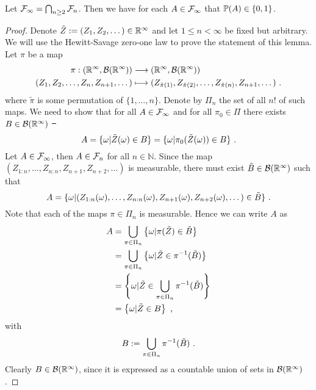 \begin{lemma} \label{lem:hewitt_savage}
	Let $\F_\infty = \bigcap_{n\geq 2} \F_n$. Then we have for each $A\in \F_\infty$ that $\P(A)\in \{0,1\}$.
	\begin{proof}
		Denote $\tilde{Z}:=(Z_1, Z_2,\dots)\in\R^\infty$ and let $1\leq n<\infty$ be fixed but arbitrary. We will use the Hewitt-Savage zero-one law to prove the statement of this lemma. Let $\pi$  be a map
		\begin{align*}
		\pi: (\R^\infty, \mathcal{B}(\R^\infty)) &\longrightarrow (\R^\infty, \mathcal{B}(\R^\infty))\\
		(Z_1, Z_2,\dots,Z_n, Z_{n+1}, \dots) &\longmapsto (Z_{\tilde\pi(1)}, Z_{\tilde\pi(2)},\dots,Z_{\tilde\pi(n)}, Z_{n+1}, \dots)\mdot
		\end{align*}
		where $\tilde{\pi}$ is some permutation of $\{1,\dots,n\}$. Denote by $\Pi_n$ the set of all $n!$ of such maps. 
		We need to show that for all $A\in\F_\infty$ and for all $\pi_0\in\Pi$ there exists $B\in\mathcal{B}(\R^\infty)$ \st\ 
		\begin{equation}
		A = \{\omega| \tilde{Z}(\omega) \in B\} = \{\omega| \pi_0(\tilde{Z}(\omega)) \in B\} \mdot
		\label{eq:hewitt_savage}
		\end{equation} 	
		Let $A\in\F_\infty$, then $A\in\F_n$ for all $n\in\mathbb{N}$. Since the map $(Z_{1:n}, \dots, Z_{n:n}, Z_{n+1}, Z_{n+2}, \dots)$ is measurable, there must exist $\tilde{B}\in\mathcal{B}(\R^\infty)$ such that
		\begin{equation*}
		A = \{\omega | (Z_{1:n}(\omega), \dots, Z_{n:n}(\omega), Z_{n+1}(\omega), Z_{n+2}(\omega), \dots) \in \tilde{B}\}\mdot 
		\label{eq:A_Z_inv}
		\end{equation*}
		Note that each of the maps $\pi\in\Pi_n$ is measurable. Hence we can write $A$ as
		\begin{align*}
		A &= \bigcup\limits_{\pi\in\Pi_n}\left \{\omega | \pi(\tilde{Z}) \in \tilde{B}\right\}\\
		&=  \bigcup\limits_{\pi\in\Pi_n} \left\{\omega | \tilde{Z} \in \pi^{-1}(\tilde{B})\right\}\\
		&=  \left\{\omega | \tilde{Z} \in \bigcup\limits_{\pi\in\Pi_n}\pi^{-1}(\tilde{B})\right\}\\
		&= \left\{\omega | \tilde{Z} \in B\right\}\mcomma
		\end{align*}		
		with 
		$$B:=\bigcup\limits_{\pi\in\Pi_n}\pi^{-1}(\tilde{B})\mdot$$
		Clearly $B\in\mathcal{B}(\R^\infty)$, since it is expressed as a countable union of sets in $\mathcal{B}(\R^\infty)$.

\end{proof}
\end{lemma}
